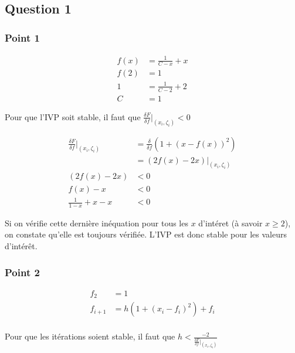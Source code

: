 \subsection{Question 1}

\subsubsection{Point 1}

\begin{equation}
	\begin{aligned}
		f(x) &= \frac{1}{C - x} + x\\
		f(2) &= 1\\
		1 &= \frac{1}{C - 2} + 2\\
		C &= 1
	\end{aligned}
\end{equation}

Pour que l'IVP soit stable, il faut que $\frac{\delta F}{\delta f}|_{(x_i, \zeta_i)}<0$

\begin{equation}
	\begin{aligned}
		\frac{\delta F}{\delta f}|_{(x_i, \zeta_i)} &= \frac{\delta}{\delta f} (1+(x-f(x))^2)\\
		&= (2f(x)-2x)|_{(x_i, \zeta_i)}\\
		(2f(x)-2x) &<0\\
		f(x)-x &< 0\\
		\frac{1}{1-x}+x-x&<0
	\end{aligned}
\end{equation}

Si on vérifie cette dernière inéquation pour tous les $x$ d'intéret (à savoir $x \geq 2$), on constate qu'elle est toujours vérifiée. L'IVP est donc stable pour les valeurs d'intérêt.

\subsubsection{Point 2}

\begin{equation}
	\begin{aligned}
		f_2 &= 1\\
		f_{i+1} &= h(1 + (x_i - f_i)^2)+f_i\\
	\end{aligned}
\end{equation}

Pour que les itérations soient stable, il faut que $h < \frac{-2}{\frac{\delta F}{\delta f}|_{(x_i, \zeta_i)}}$


